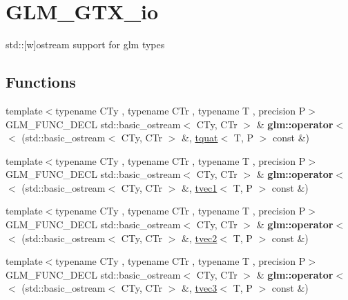\hypertarget{group__gtx__io}{}\section{G\+L\+M\+\_\+\+G\+T\+X\+\_\+io}
\label{group__gtx__io}


std\+:\+:\mbox{[}w\mbox{]}ostream support for glm types  


\subsection*{Functions}
\begin{DoxyCompactItemize}
\item 
\mbox{\label{group__gtx__io_ga038d37e8d7965dc7bfae5dc23e4140af}} 
{\footnotesize template$<$typename C\+Ty , typename C\+Tr , typename T , precision P$>$ }\\G\+L\+M\+\_\+\+F\+U\+N\+C\+\_\+\+D\+E\+CL std\+::basic\+\_\+ostream$<$ C\+Ty, C\+Tr $>$ \& {\bfseries glm\+::operator$<$$<$} (std\+::basic\+\_\+ostream$<$ C\+Ty, C\+Tr $>$ \&, \hyperlink{structglm_1_1tquat}{tquat}$<$ T, P $>$ const \&)
\item 
\mbox{\label{group__gtx__io_ga171289d1671b75e033a1b078c68a7460}} 
{\footnotesize template$<$typename C\+Ty , typename C\+Tr , typename T , precision P$>$ }\\G\+L\+M\+\_\+\+F\+U\+N\+C\+\_\+\+D\+E\+CL std\+::basic\+\_\+ostream$<$ C\+Ty, C\+Tr $>$ \& {\bfseries glm\+::operator$<$$<$} (std\+::basic\+\_\+ostream$<$ C\+Ty, C\+Tr $>$ \&, \hyperlink{structglm_1_1tvec1}{tvec1}$<$ T, P $>$ const \&)
\item 
\mbox{\label{group__gtx__io_ga0a3bca262adbba991f394d8d3d52e10d}} 
{\footnotesize template$<$typename C\+Ty , typename C\+Tr , typename T , precision P$>$ }\\G\+L\+M\+\_\+\+F\+U\+N\+C\+\_\+\+D\+E\+CL std\+::basic\+\_\+ostream$<$ C\+Ty, C\+Tr $>$ \& {\bfseries glm\+::operator$<$$<$} (std\+::basic\+\_\+ostream$<$ C\+Ty, C\+Tr $>$ \&, \hyperlink{structglm_1_1tvec2}{tvec2}$<$ T, P $>$ const \&)
\item 
\mbox{\label{group__gtx__io_ga0d6cfb5d138639b90f18d7bbb2a4ae56}} 
{\footnotesize template$<$typename C\+Ty , typename C\+Tr , typename T , precision P$>$ }\\G\+L\+M\+\_\+\+F\+U\+N\+C\+\_\+\+D\+E\+CL std\+::basic\+\_\+ostream$<$ C\+Ty, C\+Tr $>$ \& {\bfseries glm\+::operator$<$$<$} (std\+::basic\+\_\+ostream$<$ C\+Ty, C\+Tr $>$ \&, \hyperlink{structglm_1_1tvec3}{tvec3}$<$ T, P $>$ const \&)

\end{DoxyCompactItemize}

